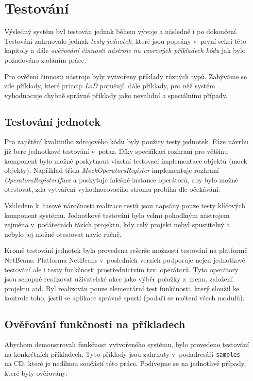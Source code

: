\chapter{Testování}

Výsledný systém byl testován jednak během vývoje a následně i po dokončení. Testování zahrnovalo jednak \emph{testy jednotek}, které jsou popsány v~první sekci této kapitoly a dále \emph{ověřování činnosti nástroje na vzorových příkladech kódu} jak bylo požadováno zadáním práce.

Pro ověření činnosti nástroje byly vytvořeny příklady různých typů. Zabýváme se zde příklady, které princip \emph{LoD} porušují, dále příklady, pro něž systém vyhodnocuje chybně správné příklady jako nevalidní a speciálními případy.

\section{Testování jednotek}
Pro zajištění kvalitního zdrojového kódu byly použity testy jednotek. Fáze návrhu již bere jednotkové testování v~potaz. Díky specifikaci rozhraní pro většinu komponent bylo možné poskytnout vlastní testovací implementace objektů (mock objekty). Například třída \emph{MockOperatorsRegister} implementuje rozhraní \emph{OperatorsRegisterIface} a poskytuje falešné instance operátorů, aby bylo možné otestovat, zda vytváření vyhodnocovacího stromu probíhá dle očekávání.

Vzhledem k~časové náročnosti realizace testů jsou napsány pouze testy klíčových komponent systému. Jednotkové testování bylo velmi pohodlným nástrojem zejména v~počátečních fázích projektu, kdy celý projekt nebyl spustitelný a nebylo jej možné otestovat navíc ručně.

Kromě testování jednotek byla provedena rešerše možností testování na platformě NetBeans. Platforma NetBeans v~posledních verzích podporuje nejen jednotkové testování ale i testy funkčnosti prostřednictvím tzv. operátorů. Tyto operátory jsou schopné realizovat uživatelské akce jako výběr položky z~menu, založení projektu atd. Byl realizován pouze elementární test funkčnosti, který sloužil ke kontrole toho, jestli se aplikace správně spustí (podaří se načtení všech modulů).

\section{Ověřování funkčnosti na příkladech}
Abychom demonstrovali funkčnost vytvořeného systému, bylo provedeno testování na konkrétních příkladech. Tyto příklady jsou zahrnuty v~podadresáři \verb+samples+ na CD, které je nedílnou součástí této práce. Podívejme se na jednotlivé případy, které byly ověřovány:

